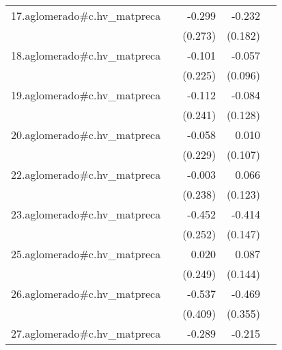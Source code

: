 {\begin{longtable}{l*{4}{D{.}{.}{-1}}}
\addlinespace
17.aglomerado#c.hv\_matpreca&                     &      -0.299         &      -0.232         &                     \\
            &                     &     (0.273)         &     (0.182)         &                     \\
\addlinespace
18.aglomerado#c.hv\_matpreca&                     &      -0.101         &      -0.057         &                     \\
            &                     &     (0.225)         &     (0.096)         &                     \\
\addlinespace
19.aglomerado#c.hv\_matpreca&                     &      -0.112         &      -0.084         &                     \\
            &                     &     (0.241)         &     (0.128)         &                     \\
\addlinespace
20.aglomerado#c.hv\_matpreca&                     &      -0.058         &       0.010         &                     \\
            &                     &     (0.229)         &     (0.107)         &                     \\
\addlinespace
22.aglomerado#c.hv\_matpreca&                     &      -0.003         &       0.066         &                     \\
            &                     &     (0.238)         &     (0.123)         &                     \\
\addlinespace
23.aglomerado#c.hv\_matpreca&                     &      -0.452         &      -0.414\sym{**} &                     \\
            &                     &     (0.252)         &     (0.147)         &                     \\
\addlinespace
25.aglomerado#c.hv\_matpreca&                     &       0.020         &       0.087         &                     \\
            &                     &     (0.249)         &     (0.144)         &                     \\
\addlinespace
26.aglomerado#c.hv\_matpreca&                     &      -0.537         &      -0.469         &                     \\
            &                     &     (0.409)         &     (0.355)         &                     \\
\addlinespace
27.aglomerado#c.hv\_matpreca&                     &      -0.289         &      -0.215\sym{***}&                     \\

\end{longtable}}
